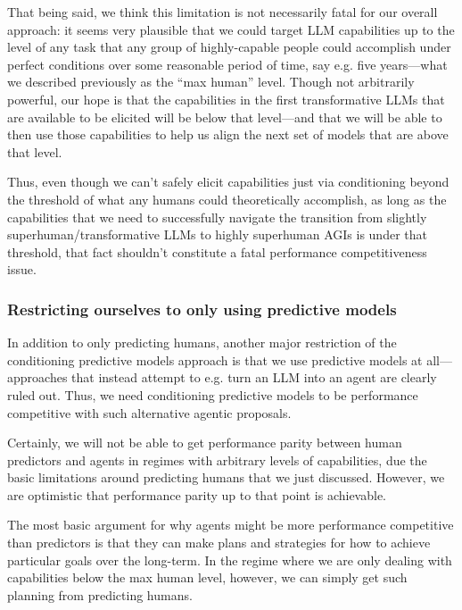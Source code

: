\documentclass[
  onecolumn,
  natbib,
]{miri-tech-article}
\begin{document}
That being said, we think this limitation is not necessarily fatal for our overall approach: it seems very plausible that we could target LLM capabilities up to the level of any task that any group of highly-capable people could accomplish under perfect conditions over some reasonable period of time, say e.g. five years---what we described previously as the ``max human'' level. Though not arbitrarily powerful, our hope is that the capabilities in the first transformative LLMs that are available to be elicited will be below that level---and that we will be able to then use those capabilities to help us align the next set of models that are above that level.

Thus, even though we can't safely elicit capabilities just via conditioning beyond the threshold of what any humans could theoretically accomplish, as long as the capabilities that we need to successfully navigate the transition from slightly superhuman/transformative LLMs to highly superhuman AGIs is under that threshold, that fact shouldn't constitute a fatal performance competitiveness issue.


\subsubsection{Restricting ourselves to only using predictive models}\label{subsubsec:restricting_ourselves_to_only_using_predictive_models}

In addition to only predicting humans, another major restriction of the conditioning predictive models approach is that we use predictive models at all---approaches that instead attempt to e.g. turn an LLM into an agent are clearly ruled out. Thus, we need conditioning predictive models to be performance competitive with such alternative agentic proposals.

Certainly, we will not be able to get performance parity between human predictors and agents in regimes with arbitrary levels of capabilities, due the basic limitations around predicting humans that we just discussed. However, we are optimistic that performance parity up to that point is achievable.

The most basic argument for why agents might be more performance competitive than predictors is that they can make plans and strategies for how to achieve particular goals over the long-term. In the regime where we are only dealing with capabilities below the max human level, however, we can simply get such planning from predicting humans.
\end{document}
